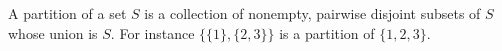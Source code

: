 A partition of a set $S$ is a collection of nonempty, pairwise disjoint subsets of $S$ whose union is $S$.
For instance $\{\{1\}, \{2, 3\}\}$ is a partition of $\{1, 2, 3\}$.